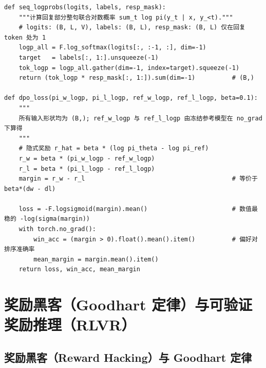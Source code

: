 \begin{lstlisting}[caption={直接偏好优化（DPO）核心损失与隐式准确率监控（简洁 PyTorch 实现）}]
def seq_logprobs(logits, labels, resp_mask):
    """计算回复部分整句联合对数概率 sum_t log pi(y_t | x, y_<t)."""
    # logits: (B, L, V), labels: (B, L), resp_mask: (B, L) 仅在回复 token 处为 1
    logp_all = F.log_softmax(logits[:, :-1, :], dim=-1)
    target   = labels[:, 1:].unsqueeze(-1)
    tok_logp = logp_all.gather(dim=-1, index=target).squeeze(-1)
    return (tok_logp * resp_mask[:, 1:]).sum(dim=-1)          # (B,)

def dpo_loss(pi_w_logp, pi_l_logp, ref_w_logp, ref_l_logp, beta=0.1):
    """
    所有输入形状均为 (B,); ref_w_logp 与 ref_l_logp 由冻结参考模型在 no_grad 下算得
    """
    # 隐式奖励 r_hat = beta * (log pi_theta - log pi_ref)
    r_w = beta * (pi_w_logp - ref_w_logp)
    r_l = beta * (pi_l_logp - ref_l_logp)
    margin = r_w - r_l                                        # 等价于 beta*(dw - dl)

    loss = -F.logsigmoid(margin).mean()                       # 数值最稳的 -log(sigma(margin))
    with torch.no_grad():
        win_acc = (margin > 0).float().mean().item()          # 偏好对排序准确率
        mean_margin = margin.mean().item()
    return loss, win_acc, mean_margin
\end{lstlisting}

\section{奖励黑客（Goodhart 定律）与可验证奖励推理（RLVR）}
\label{sec:hacking-rlvr}

\subsection{奖励黑客（Reward Hacking）与 Goodhart 定律}

